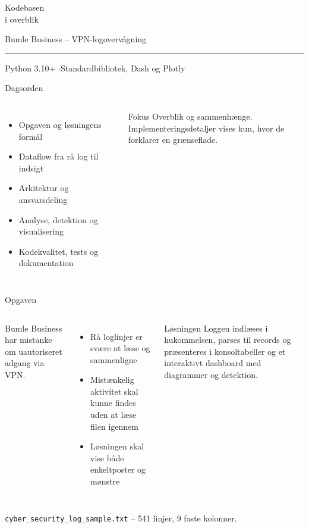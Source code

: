 \documentclass[aspectratio=169,10pt]{beamer}
\newcommand{\code}[1]{\texttt{\small #1}}
\begin{document}
\begin{frame}
  \vfill
  {\color{accent}\Huge Kodebasen\\[0.15em] i overblik\par}
  \vspace{0.4em}
  {\color{muted}\Large Bumle Business -- VPN-logovervågning\par}
  \vspace{1.4em}
  \textcolor{accent}{\rule{4cm}{2pt}}
  \vfill
  {\small Python 3.10+ \quad$\cdot$\quad Standardbibliotek, Dash og Plotly\par}
\end{frame}

\begin{frame}{Dagsorden}
  \begin{columns}[T]
    \begin{itemize}
      \item Opgaven og løsningens formål
      \item Dataflow fra rå log til indsigt
      \item Arkitektur og ansvarsdeling
      \item Analyse, detektion og visualisering
      \item Kodekvalitet, tests og dokumentation
    \end{itemize}
    \begin{block}{Fokus}
      \small Overblik og sammenhænge.\\
      Implementeringsdetaljer vises kun, hvor de forklarer en grænseflade.
    \end{block}
  \end{columns}
\end{frame}

\begin{frame}{Opgaven}
  \begin{columns}[T]
    Bumle Business har mistanke om uautoriseret adgang via VPN.
    \vspace{0.6em}
    \begin{itemize}
      \item Rå loglinjer er svære at læse og sammenligne
      \item Mistænkelig aktivitet skal kunne findes uden at læse filen igennem
      \item Løsningen skal vise både enkeltposter og mønstre
    \end{itemize}
    \begin{block}{Løsningen}
      \small Loggen indlæses i hukommelsen, parses til records og præsenteres i konsoltabeller og et interaktivt dashboard med diagrammer og detektion.
    \end{block}
  \end{columns}
  \vfill
  {\footnotesize\color{muted}\code{cyber\_security\_log\_sample.txt} -- 541 linjer, 9 faste kolonner.}
\end{frame}
\end{document}

